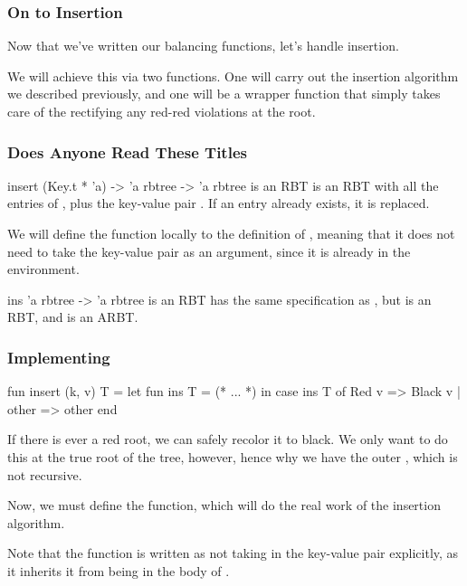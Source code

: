 \documentclass[aspectratio=169, handout]{beamer}
\begin{document}
\begin{frame}[fragile]
  \frametitle{On to Insertion}

  Now that we've written our balancing functions, let's handle insertion.

  \pause
  \vspace{\fill}

  We will achieve this via two functions. One will carry out the
  insertion algorithm we described previously, and one will be a wrapper
  function that simply takes care of the rectifying any red-red violations
  at the root.
\end{frame}



\begin{frame}
  \frametitle{Does Anyone Read These Titles}

  \spec
    {insert}
    {(Key.t * 'a) -> 'a rbtree -> 'a rbtree}
    { is an RBT}
    { is an RBT with all the entries of ,
    plus the key-value pair . If an entry already exists,
    it is replaced.}

  \pause
  \vspace{\fill}

  We will define the  function locally to the definition of
  , meaning that it does not need to take the key-value
  pair as an argument, since it is already in the environment.

  \pause
  \vspace{\fill}

  \spec
    {ins}
    {'a rbtree -> 'a rbtree}
    { is an RBT}
    { has the same specification as , but
     is an RBT, and  is
    an ARBT.}
\end{frame}

\begin{frame}[fragile]
  \frametitle{Implementing }

  \begin{codeblock}
    fun insert (k, v) T =
      let
        fun ins T = (* ... *)
      in
        case ins T of
          Red v => Black v
        | other => other
      end
  \end{codeblock}

  \pause
  \vspace{\fill}

  If there is ever a red root, we can safely recolor it to black. We only
  want to do this at the true root of the tree, however, hence why we have the
  outer , which is not recursive.

  \pause
  \vspace{\fill}

  Now, we must define the  function, which will do the real work of
  the insertion algorithm.

  \pause
  \vspace{\fill}

  Note that the  function is written as not taking in the
  key-value pair  explicitly, as it inherits it from being
  in the body of .
\end{frame}
\end{document}
